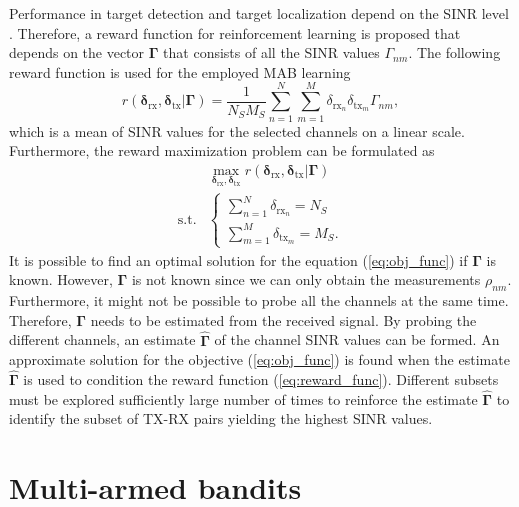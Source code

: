 \documentclass[conference]{IEEEtran}
\newcommand{\esinrexp}{\Gamma_{nm}}
\newcommand{\vsinrexp}{\boldsymbol{\Gamma}}
\newcommand{\vsinrb}{\widehat{\boldsymbol{\Gamma}}}
\newcommand{\easvtx}{\delta_{\text{tx}_m}}
\newcommand{\vasvtx}{\boldsymbol{\delta}_{\text{tx}}}
\newcommand{\easvrx}{\delta_{\text{rx}_n}}
\newcommand{\vasvrx}{\boldsymbol{\delta}_{\text{rx}}}
\newcommand{\esp}{\rho_{nm}}
\begin{document}
Performance in target detection and target localization depend on the SINR level \cite{aittomaeki2011, Aittomaeki2018, Godrich2011, Sun2014}.
Therefore, a reward function for reinforcement learning is proposed that depends on the vector $\vsinrexp$ that consists of all the SINR values $\esinrexp$.
The following reward function is used for the employed MAB learning
\begin{equation}\label{eq:reward_func}
    r(\vasvrx, \vasvtx | \vsinrexp) = \frac{1}{N_S M_S}\sum_{n=1}^N \sum_{m=1}^M  \easvrx \easvtx \esinrexp,
\end{equation}
which is a mean of SINR values for the selected channels on a linear scale.
Furthermore, the reward maximization problem can be formulated as
\begin{equation}\label{eq:obj_func}
    \begin{array}{ll}
                &   \max_{\vasvrx, \vasvtx} r(\vasvrx, \vasvtx | \vsinrexp) \\[7pt]
    \text{s.t.} &   
                \left\{\begin{array}{l}
                    \sum_{n=1}^N \easvrx = N_S \\
                    \sum_{m=1}^M \easvtx = M_S.
                \end{array}\right.
    \end{array}
\end{equation}
It is possible to find an optimal solution for the equation (\ref{eq:obj_func}) if $\vsinrexp$ is known.
However, $\vsinrexp$ is not known since we can only obtain the measurements $\esp$. 
Furthermore, it might not be possible to probe all the channels at the same time.
Therefore, $\vsinrexp$ needs to be estimated from the received signal. 
By probing the different channels, an estimate $\vsinrb$ of the channel SINR values can be formed.
An approximate solution for the objective (\ref{eq:obj_func}) is found when the estimate $\vsinrb$ is used to condition the reward function (\ref{eq:reward_func}).
Different subsets must be explored sufficiently large number of times to reinforce the estimate $\vsinrb$ to identify the subset of TX-RX pairs yielding the highest SINR values.

\section{Multi-armed bandits}
\label{sec:mab}
\end{document}
